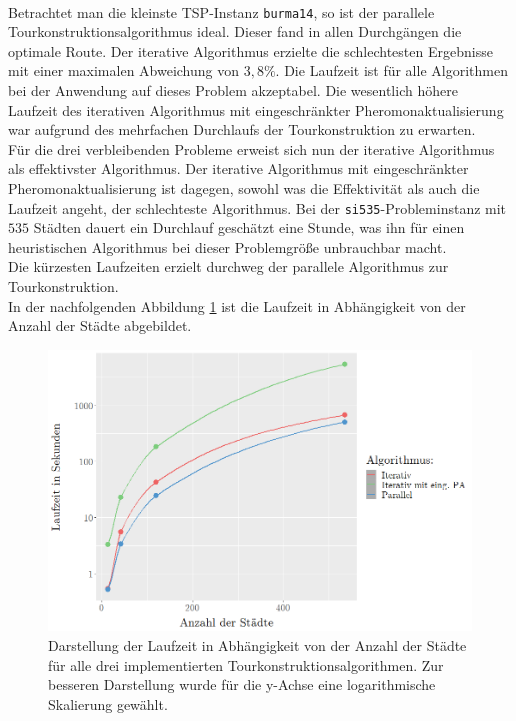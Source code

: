 \documentclass[doktyp=barbeit, sprache=german]{TUBAFarbeiten}
\begin{document}
\\Betrachtet man die kleinste TSP-Instanz \texttt{burma14}, so ist der parallele Tourkonstruktionsalgorithmus ideal. Dieser fand in allen Durchgängen die optimale Route. Der iterative Algorithmus erzielte die schlechtesten Ergebnisse mit einer maximalen Abweichung von $3,8 \%$. Die Laufzeit ist für alle Algorithmen bei der Anwendung auf dieses Problem akzeptabel. Die wesentlich höhere Laufzeit des iterativen Algorithmus mit eingeschränkter Pheromonaktualisierung war aufgrund des mehrfachen Durchlaufs der Tourkonstruktion zu erwarten.
\\Für die drei verbleibenden Probleme erweist sich nun der iterative Algorithmus als effektivster Algorithmus. Der iterative Algorithmus mit eingeschränkter Pheromonaktualisierung ist dagegen, sowohl was die Effektivität als auch die Laufzeit angeht, der schlechteste Algorithmus. Bei der \texttt{si535}-Probleminstanz mit $535$ Städten dauert ein Durchlauf geschätzt eine Stunde, was ihn für einen heuristischen Algorithmus bei dieser Problemgröße unbrauchbar macht. \\Die kürzesten Laufzeiten erzielt durchweg der parallele Algorithmus zur Tourkonstruktion.
\\In der nachfolgenden Abbildung \ref{img:runtimecity} ist die Laufzeit in Abhängigkeit von der Anzahl der Städte abgebildet.
\begin{figure}[!]
\captionsetup{justification=centering}
  \centering
     \includegraphics[width=\textwidth]{images/diagramruntimes.png}
  \caption[Darstellung der Laufzeit in Abhängigkeit von der Anzahl der Städte für alle drei implementierten Tourkonstruktionsalgorithmen]{Darstellung der Laufzeit in Abhängigkeit von der Anzahl der Städte für alle drei implementierten Tourkonstruktionsalgorithmen. Zur besseren Darstellung wurde für die y-Achse eine logarithmische Skalierung gewählt.}
  \label{img:runtimecity}
\end{figure}
\end{document}
